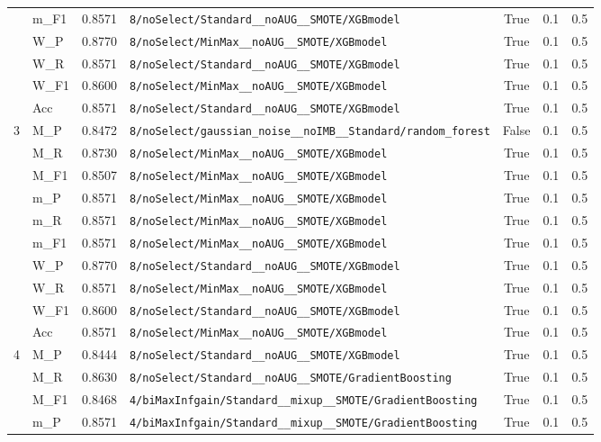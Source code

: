 \begin{table}[htbp]
\begin{tabular}{|c|l|c|>{\ttfamily\footnotesize}p{7.2cm}|c|c|c|}
 & m\_F1 & 0.8571 & \texttt{8/noSelect/Standard\_\_noAUG\_\_SMOTE/XGBmodel} & True & 0.1 & 0.5 \\
 & W\_P & 0.8770 & \texttt{8/noSelect/MinMax\_\_noAUG\_\_SMOTE/XGBmodel} & True & 0.1 & 0.5 \\
 & W\_R & 0.8571 & \texttt{8/noSelect/Standard\_\_noAUG\_\_SMOTE/XGBmodel} & True & 0.1 & 0.5 \\
 & W\_F1 & 0.8600 & \texttt{8/noSelect/MinMax\_\_noAUG\_\_SMOTE/XGBmodel} & True & 0.1 & 0.5 \\
 & Acc & 0.8571 & \texttt{8/noSelect/Standard\_\_noAUG\_\_SMOTE/XGBmodel} & True & 0.1 & 0.5 \\
\hline
\multirow{10}{*}{3} & M\_P & 0.8472 & \texttt{8/noSelect/gaussian\_noise\_\_noIMB\_\_Standard/random\_forest} & False & 0.1 & 0.5 \\
 & M\_R & 0.8730 & \texttt{8/noSelect/MinMax\_\_noAUG\_\_SMOTE/XGBmodel} & True & 0.1 & 0.5 \\
 & M\_F1 & 0.8507 & \texttt{8/noSelect/MinMax\_\_noAUG\_\_SMOTE/XGBmodel} & True & 0.1 & 0.5 \\
 & m\_P & 0.8571 & \texttt{8/noSelect/MinMax\_\_noAUG\_\_SMOTE/XGBmodel} & True & 0.1 & 0.5 \\
 & m\_R & 0.8571 & \texttt{8/noSelect/MinMax\_\_noAUG\_\_SMOTE/XGBmodel} & True & 0.1 & 0.5 \\
 & m\_F1 & 0.8571 & \texttt{8/noSelect/MinMax\_\_noAUG\_\_SMOTE/XGBmodel} & True & 0.1 & 0.5 \\
 & W\_P & 0.8770 & \texttt{8/noSelect/Standard\_\_noAUG\_\_SMOTE/XGBmodel} & True & 0.1 & 0.5 \\
 & W\_R & 0.8571 & \texttt{8/noSelect/MinMax\_\_noAUG\_\_SMOTE/XGBmodel} & True & 0.1 & 0.5 \\
 & W\_F1 & 0.8600 & \texttt{8/noSelect/Standard\_\_noAUG\_\_SMOTE/XGBmodel} & True & 0.1 & 0.5 \\
 & Acc & 0.8571 & \texttt{8/noSelect/MinMax\_\_noAUG\_\_SMOTE/XGBmodel} & True & 0.1 & 0.5 \\
\hline
\multirow{10}{*}{4} & M\_P & 0.8444 & \texttt{8/noSelect/Standard\_\_noAUG\_\_SMOTE/XGBmodel} & True & 0.1 & 0.5 \\
 & M\_R & 0.8630 & \texttt{8/noSelect/Standard\_\_noAUG\_\_SMOTE/GradientBoosting} & True & 0.1 & 0.5 \\
 & M\_F1 & 0.8468 & \texttt{4/biMaxInfgain/Standard\_\_mixup\_\_SMOTE/GradientBoosting} & True & 0.1 & 0.5 \\
 & m\_P & 0.8571 & \texttt{4/biMaxInfgain/Standard\_\_mixup\_\_SMOTE/GradientBoosting} & True & 0.1 & 0.5 \\

\end{tabular}
\end{table}
